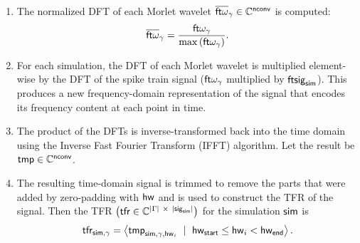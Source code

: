 \begin{enumerate}
    \item The normalized DFT of each Morlet wavelet $\overline{\mathsf{ft}\omega}_{\gamma} \in \mathbb{C}^{\mathsf{nconv}}$ is computed:
    \begin{equation}
        \overline{\mathsf{ft}\omega}_{\gamma} = 
        \frac{
            {\mathsf{ft}}{\omega_{\gamma}}
        }{
            \max \left(
                {\mathsf{ft}}{\omega_{\gamma}}
            \right)
        }.
    \end{equation}

    \item For each simulation, the DFT of each Morlet wavelet is multiplied element-wise by the DFT of the spike train signal ($\mathsf{ft}{\omega_{\gamma}}$ multiplied by $\mathsf{ft}\mathsf{sig}_{\mathsf{sim}}$). This produces a new frequency-domain representation of the signal that encodes its frequency content at each point in time.

    \item The product of the DFTs is inverse-transformed back into the time domain using the Inverse Fast Fourier Transform (IFFT) algorithm. Let the result be $\mathsf{tmp} \in \mathbb{C}^{\mathsf{nconv}}$.
    
    \item The resulting time-domain signal is trimmed to remove the parts that were added by zero-padding with $\mathsf{hw}$ and is used to construct the TFR of the signal. Then the TFR $\left( \mathsf{tfr} \in \mathbb{C}^{ |\Gamma| \ \times \ |\mathsf{sig}_{\mathsf{sim}}|} \right)$ for the simulation $\mathsf{sim}$ is
    \begin{equation}
        \tfr_{\tfrsimulation, \onegammafreq} 
        = 
        \left< 
            \tmp_{\tfrsimulation, \onegammafreq, \halfwave_i} 
            \ \mid \ 
            \halfwave_\substart \leq \halfwave_i < \halfwave_\subend
        \right>.
    \end{equation}
    

\end{enumerate}
